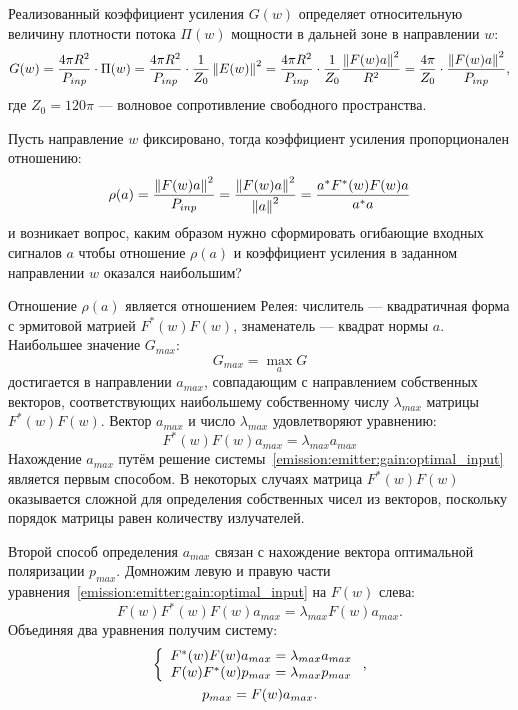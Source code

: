 Реализованный коэффициент усиления $G(w)$ определяет относительную величину плотности потока $\Pi(w)$ мощности в дальней зоне в
направлении $w$:
\[
    G(w)
    = \frac{4 \pi R^2}{P_{inp}} \cdot \Pi(w)
    = \frac{4 \pi R^2}{P_{inp}} \cdot \frac{1}{Z_0} \left \| E(w) \right \|^2
    = \frac{4 \pi R^2}{P_{inp}} \cdot \frac{1}{Z_0} \frac{\left \| F(w) a \right \|^2}{R^2}
    = \frac{4 \pi}{Z_0} \cdot \frac{\left \| F(w) a \right \|^2}{P_{inp}} ,
\]
где $Z_0 = 120 \pi$ --- волновое сопротивление свободного пространства.

Пусть направление $w$ фиксировано, тогда коэффициент усиления пропорционален отношению:
\begin{equation}
    \label{emission:emitter:gain:rayleigh}
    \rho(a)
    = \frac{\left \| F(w) a \right \|^2}{P_{inp}}
    = \frac{\left \| F(w) a \right \|^2}{\left \| a \right \|^2}
    = \frac{a^* F^*(w) F(w) a}{a^* a}
\end{equation}
и возникает вопрос, каким образом нужно сформировать огибающие входных сигналов $a$ чтобы отношение $\rho(a)$ и коэффициент усиления в заданном направлении $w$
оказался наибольшим?

Отношение $\rho(a)$ является отношением Релея: числитель --- квадратичная форма с эрмитовой матрией $F^*(w) F(w)$, знаменатель --- квадрат нормы $a$.
Наибольшее значение $G_{max}$:
\[
    G_{max} = \max \limits_{a} G
\]
достигается в направлении $a_{max}$, совпадающим с направлением собственных векторов, соответствующих наибольшему собственному числу $\lambda_{max}$ матрицы $F^*(w)F(w)$.
Вектор $a_{max}$ и число $\lambda_{max}$ удовлетворяют уравнению:
\begin{equation}
    \label{emission:emitter:gain:optimal_input}
    F^*(w) F(w) a_{max} = \lambda_{max} a_{max}
\end{equation}
Нахождение $a_{max}$ путём решение системы~\eqref{emission:emitter:gain:optimal_input} является первым способом. В некоторых случаях матрица $F^*(w)F(w)$ оказывается сложной
для определения собственных чисел из векторов, поскольку порядок матрицы равен количеству излучателей.

Второй способ определения $a_{max}$ связан с нахождение вектора оптимальной поляризации $p_{max}$. Домножим левую и правую части
уравнения~\eqref{emission:emitter:gain:optimal_input} на $F(w)$ слева:
\[
    F(w) F^*(w) F(w) a_{max} = \lambda_{max} F(w) a_{max} .
\]
Объединяя два уравнения получим систему:
\begin{gather}
    \left \{
    \begin{array}{c}
        F^*(w) F(w) a_{max} = \lambda_{max} a_{max} \\
        F(w) F^*(w) p_{max} = \lambda_{max} p_{max}
    \end{array}
    \right .
    \label{emission:emitter:gain:system}, \\
    p_{max} = F(w) a_{max} \notag.
\end{gather}

